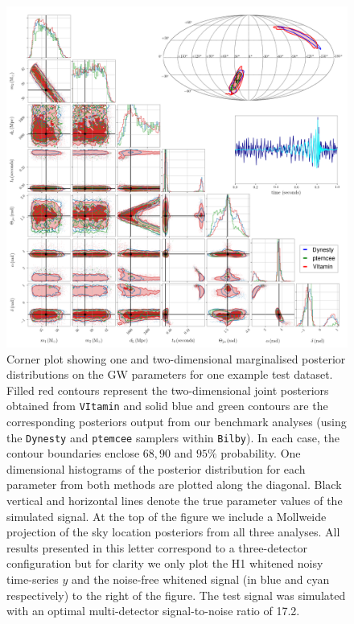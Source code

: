\documentclass{article}
\begin{document}
%
%
\begin{figure}
    \includegraphics[width=\textwidth]{images/corner_testcase0.png}
    \caption{\label{fig:corner_plot} Corner plot showing one and two-dimensional
marginalised posterior distributions on the \ac{GW} parameters for one
example test dataset. Filled red contours represent the
two-dimensional joint posteriors obtained from \texttt{VItamin} and
solid blue and green contours are the corresponding posteriors
output from our benchmark analyses (using the \texttt{Dynesty} and \texttt{ptemcee}
samplers within \texttt{Bilby}). In each case, the contour boundaries enclose
$68,90$ and $95\%$ probability. One dimensional histograms of the posterior
distribution for each parameter from both methods are plotted along the
diagonal. Black vertical and horizontal lines denote the true parameter
values of the simulated signal. At the top of the figure we include a Mollweide
projection of the sky location posteriors from all three analyses. All results
presented in this letter correspond to a three-detector configuration but for
clarity we only plot the H1 whitened noisy time-series $y$ and the noise-free
whitened signal (in blue and cyan respectively) to the right of the figure. The
test signal was simulated with an optimal multi-detector signal-to-noise ratio of
17.2.} 
\end{figure}
\end{document}
